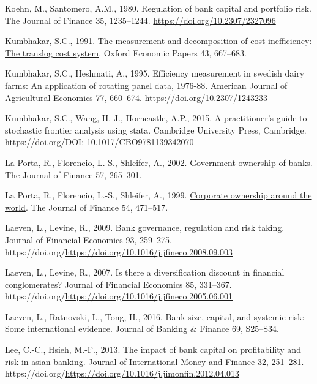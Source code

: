 \documentclass[
  12pt,
  a4paper,
  DIV=11,
  numbers=noendperiod]{scrreprt}
\newlength{\cslhangindent}
\newenvironment{CSLReferences}[2] %
 {\begin{list}{}{%
  \setlength{\itemindent}{0pt}
  \setlength{\leftmargin}{0pt}
  \setlength{\parsep}{0pt}
  \ifodd #1
   \setlength{\leftmargin}{\cslhangindent}
   \setlength{\itemindent}{-1\cslhangindent}
  \fi
  \setlength{\itemsep}{#2\baselineskip}}}
 {\end{list}}
\begin{document}
\begin{CSLReferences}{1}{0}
Koehn, M., Santomero, A.M., 1980. Regulation of bank capital and
portfolio risk. The Journal of Finance 35, 1235--1244.
\url{https://doi.org/10.2307/2327096}

Kumbhakar, S.C., 1991. \href{http://www.jstor.org/stable/2663415}{The
measurement and decomposition of cost-inefficiency: The translog cost
system}. Oxford Economic Papers 43, 667--683.

Kumbhakar, S.C., Heshmati, A., 1995. Efficiency measurement in swedish
dairy farms: An application of rotating panel data, 1976-88. American
Journal of Agricultural Economics 77, 660--674.
\url{https://doi.org/10.2307/1243233}

Kumbhakar, S.C., Wang, H.-J., Horncastle, A.P., 2015. A practitioner's
guide to stochastic frontier analysis using stata. Cambridge University
Press, Cambridge.
\href{https://doi.org/DOI:\%2010.1017/CBO9781139342070}{https://doi.org/DOI:
10.1017/CBO9781139342070}

La Porta, R., Florencio, L.-S., Shleifer, A., 2002.
\href{http://www.jstor.org.queens.ezp1.qub.ac.uk/stable/2697840}{Government
ownership of banks}. The Journal of Finance 57, 265--301.

La Porta, R., Florencio, L.-S., Shleifer, A., 1999.
\href{http://www.jstor.org.queens.ezp1.qub.ac.uk/stable/2697717}{Corporate
ownership around the world}. The Journal of Finance 54, 471--517.

Laeven, L., Levine, R., 2009. Bank governance, regulation and risk
taking. Journal of Financial Economics 93, 259--275.
https://doi.org/\url{https://doi.org/10.1016/j.jfineco.2008.09.003}

Laeven, L., Levine, R., 2007. Is there a diversification discount in
financial conglomerates? Journal of Financial Economics 85, 331--367.
https://doi.org/\url{https://doi.org/10.1016/j.jfineco.2005.06.001}

Laeven, L., Ratnovski, L., Tong, H., 2016. Bank size, capital, and
systemic risk: Some international evidence. Journal of Banking \&
Finance 69, S25--S34.

Lee, C.-C., Hsieh, M.-F., 2013. The impact of bank capital on
profitability and risk in asian banking. Journal of International Money
and Finance 32, 251--281.
https://doi.org/\url{https://doi.org/10.1016/j.jimonfin.2012.04.013}


\end{CSLReferences}
\end{document}
